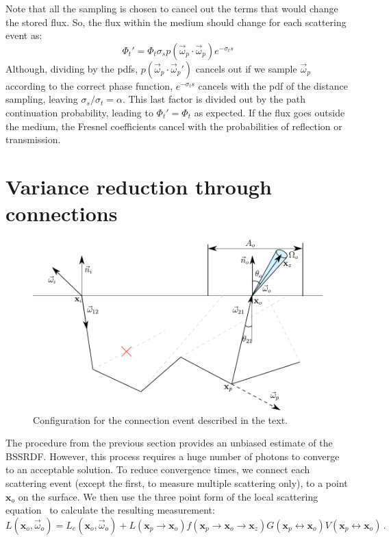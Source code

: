 \documentclass[10pt,a4paper]{article}
\newcommand{\x}{\mathbf{x}}
\newcommand{\vomega}{\vec{\omega}}
\begin{document}
Note that all the sampling is chosen to cancel out the terms that would change the stored flux. So, the flux within the medium should change for each scattering event as:
%
\[
\Phi_t' = \Phi_t \sigma_s p(\vomega_p \cdot \vomega_p) e^{-\sigma_t s}
\]
%
Although, dividing by the pdfs, $p(\vomega_p \cdot \vomega_p')$ cancels out if we sample $\vomega_p$ according to the correct phase function, $e^{-\sigma_t s}$ cancels with the pdf of the distance sampling, leaving $\sigma_s/\sigma_t = \alpha$. This last factor is divided out by the path continuation probability, leading to $\Phi_t' = \Phi_t$ as expected. If the flux goes outside the medium, the Fresnel coefficients cancel with the probabilities of reflection or transmission.



\section{Variance reduction through connections}

\begin{figure}[h]

\includegraphics[scale=0.7]{configuration.pdf}

\caption{Configuration for the connection event described in the text.}

\label{fig:diagram}

\end{figure}



\noindent The procedure from the previous section provides an unbiased estimate of the BSSRDF. However, this process requires a huge number of photons to converge to an acceptable solution. To reduce convergence times, we connect each scattering event (except the first, to measure multiple scattering only), to a point $\x_o$ on the surface. We then use the three point form of the local scattering equation~\cite{raab08} to calculate the resulting measurement:
%
\[
L(\x_o, \vomega_o) =  L_e(\x_o, \vomega_o) + L(\x_p \rightarrow \x_o) f(\x_p \rightarrow \x_o \rightarrow \x_z) G(\x_p \leftrightarrow \x_o) V(\x_p \leftrightarrow \x_o) \, .
\]
\end{document}
